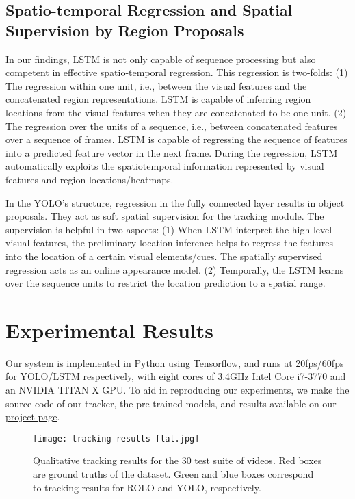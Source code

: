 \documentclass{article}
\begin{document}
\subsection{Spatio-temporal Regression and Spatial Supervision by Region Proposals}
In our findings, LSTM is not only capable of sequence processing but also competent in effective spatio-temporal regression. This regression is two-folds:
(1) The regression within one unit, i.e., between the visual features and the concatenated region representations. LSTM is capable of inferring region locations from the visual features when they are concatenated to be one unit.
(2) The regression over the units of a sequence, i.e., between concatenated features over a sequence of frames. LSTM is capable of regressing the sequence of features into a predicted feature vector in the next frame. During the regression, LSTM automatically exploits the spatiotemporal information represented by visual features and region locations/heatmaps.

In the YOLO’s structure, regression in the fully connected layer results in object proposals. They act as soft spatial supervision for the tracking module. The supervision is helpful in two aspects:
(1) When LSTM interpret the high-level visual features, the preliminary location inference helps to regress the features into the location of a certain visual elements/cues. The spatially supervised regression acts as an online appearance model.
(2) Temporally, the LSTM learns over the sequence units to restrict the location prediction to a spatial range.


\section{Experimental Results} \label{experimental-results}
Our system is implemented in Python using Tensorflow, and runs at 20fps/60fps for YOLO/LSTM respectively, with eight cores of 3.4GHz Intel Core i7-3770 and an NVIDIA TITAN X GPU.
To aid in reproducing our experiments, we make the source code of our tracker, the pre-trained models, and results available on our \href{http://guanghan.info/projects/ROLO/}{project page}.

\begin{figure}[h] %
	\centering
	\texttt{[image: tracking-results-flat.jpg]}
	\caption{Qualitative tracking results for the 30 test suite of videos. Red boxes are ground truths of the dataset. Green and blue boxes correspond to tracking results for ROLO and YOLO, respectively.}
	\label{fig-qualitative-results}
\end{figure}
\end{document}
